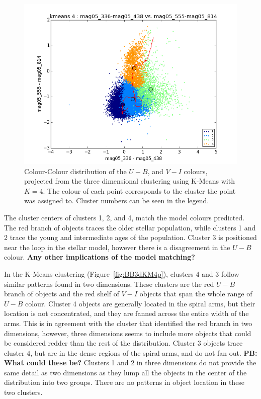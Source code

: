 \begin{figure}[H]
\centering
\includegraphics[width=\linewidth]{figs/broad/kmeans_base_color_4cl_mag05_336-mag05_438vsmag05_555-mag05_814}
\caption{Colour-Colour distribution of the $U - B$, and $V - I$ colours, projected from the three dimensional clustering using K-Means with $K=4$. The colour of each point corresponds to the cluster the point was assigned to. Cluster numbers can be seen in the legend.}
\label{fig:BB3dKM4base}
\end{figure}

The cluster centers of clusters 1, 2, and 4, match the model colours predicted.
The red branch of objects traces the older stellar population, while clusters 1 and 2 trace the young and intermediate ages of the population.
Cluster 3 is positioned near the loop in the stellar model, however there is a disagreement in the $U - B$ colour.
\textbf{Any other implications of the model matching?}

In the K-Means clustering (Figure~\ref{fig:BB3dKM4p}), clusters 4 and 3 follow similar patterns found in two dimensions.
These clusters are the red $U - B$ branch of objects and the red shelf of $V - I$ objects that span the whole range of $U - B$ colour.
Cluster 4 objects are generally located in the spiral arms, but their location is not concentrated, and they are fanned across the entire width of the arms.
This is in agreement with the cluster that identified the red branch in two dimensions, however, three dimensions seems to include more objects that could be considered redder than the rest of the distribution.
Cluster 3 objects trace cluster 4, but are in the dense regions of the spiral arms, and do not fan out. \textbf{PB: What could these be?}
Clusters 1 and 2 in three dimensions do not provide the same detail as two dimensions as they lump all the objects in the center of the distribution into two groups.
There are no patterns in object location in these two clusters.

